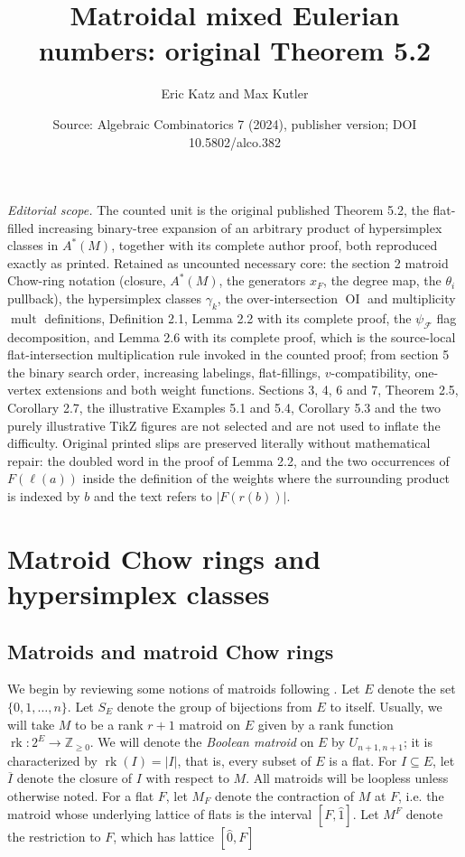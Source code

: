 \documentclass[10pt,a4paper]{amsart}
\title[Postnikov tree expansion]{Matroidal mixed Eulerian numbers: original Theorem 5.2}
\author{Eric Katz and Max Kutler}
\date{Source: Algebraic Combinatorics 7 (2024), publisher version; DOI 10.5802/alco.382}
\numberwithin{equation}{section}
\numberwithin{figure}{section}
\newcommand{\Z}{\mathbb{Z}}
\newcommand{\cF}{\mathcal{F}}
\DeclareMathOperator{\OI}{OI}
\DeclareMathOperator{\mult}{mult}
\DeclareMathOperator{\rk}{rk}
\theoremstyle{definition}
\theoremstyle{remark}
\begin{document}
\maketitle
\noindent\textit{Editorial scope.} The counted unit is the original published Theorem 5.2, the flat-filled increasing binary-tree expansion of an arbitrary product of hypersimplex classes in $A^*(M)$, together with its complete author proof, both reproduced exactly as printed. Retained as uncounted necessary core: the section 2 matroid Chow-ring notation (closure, $A^*(M)$, the generators $x_F$, the degree map, the $\theta_i$ pullback), the hypersimplex classes $\gamma_k$, the over-intersection $\OI$ and multiplicity $\mult$ definitions, Definition 2.1, Lemma 2.2 with its complete proof, the $\psi_{\cF}$ flag decomposition, and Lemma 2.6 with its complete proof, which is the source-local flat-intersection multiplication rule invoked in the counted proof; from section 5 the binary search order, increasing labelings, flat-fillings, $v$-compatibility, one-vertex extensions and both weight functions. Sections 3, 4, 6 and 7, Theorem 2.5, Corollary 2.7, the illustrative Examples 5.1 and 5.4, Corollary 5.3 and the two purely illustrative TikZ figures are not selected and are not used to inflate the difficulty. Original printed slips are preserved literally without mathematical repair: the doubled word in the proof of Lemma 2.2, and the two occurrences of $F(\ell(a))$ inside the definition of the weights where the surrounding product is indexed by $b$ and the text refers to $|F(r(b))|$.
\setcounter{section}{1}
\section{Matroid Chow rings and hypersimplex classes} \label{s:matroids}

\subsection{Matroids and matroid Chow rings}

We begin by reviewing some notions of matroids following \cite{AHK}.
Let $E$ denote the set $\{0,1,\dots,n\}$. Let $S_{E}$ denote the group of bijections from $E$ to itself.
Usually, we will take $M$ to be a rank $r+1$ matroid on $E$ given by a rank function $\rk\colon 2^{E}\to\Z_{\geq 0}$. 
We will denote the  {\em Boolean matroid} on $E$ by $U_{n+1,n+1}$; it is characterized by $\rk(I)=|I|$, that is, every subset of $E$ is a flat.
For $I\subseteq E$, let $\overline{I}$ denote the closure of $I$ with respect to $M$.
All matroids will be loopless unless otherwise noted. For a flat $F$, let $M_F$ denote the contraction of $M$ at $F$, i.e. the matroid whose underlying lattice of flats is the interval $[F,\hat{1}]$. Let $M^F$ denote the restriction to $F$, which has lattice $[\hat{0},F]$
\end{document}
